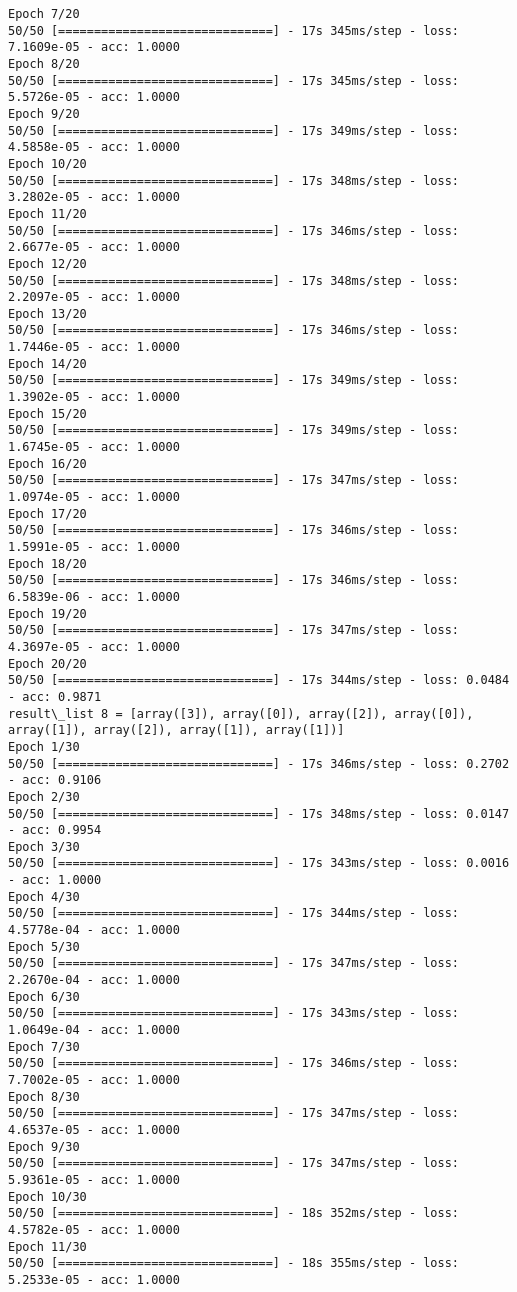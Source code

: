 \documentclass[11pt]{article}
\begin{document}
\begin{Verbatim}[commandchars=\\\{\}]
Epoch 7/20
50/50 [==============================] - 17s 345ms/step - loss: 7.1609e-05 - acc: 1.0000
Epoch 8/20
50/50 [==============================] - 17s 345ms/step - loss: 5.5726e-05 - acc: 1.0000
Epoch 9/20
50/50 [==============================] - 17s 349ms/step - loss: 4.5858e-05 - acc: 1.0000
Epoch 10/20
50/50 [==============================] - 17s 348ms/step - loss: 3.2802e-05 - acc: 1.0000
Epoch 11/20
50/50 [==============================] - 17s 346ms/step - loss: 2.6677e-05 - acc: 1.0000
Epoch 12/20
50/50 [==============================] - 17s 348ms/step - loss: 2.2097e-05 - acc: 1.0000
Epoch 13/20
50/50 [==============================] - 17s 346ms/step - loss: 1.7446e-05 - acc: 1.0000
Epoch 14/20
50/50 [==============================] - 17s 349ms/step - loss: 1.3902e-05 - acc: 1.0000
Epoch 15/20
50/50 [==============================] - 17s 349ms/step - loss: 1.6745e-05 - acc: 1.0000
Epoch 16/20
50/50 [==============================] - 17s 347ms/step - loss: 1.0974e-05 - acc: 1.0000
Epoch 17/20
50/50 [==============================] - 17s 346ms/step - loss: 1.5991e-05 - acc: 1.0000
Epoch 18/20
50/50 [==============================] - 17s 346ms/step - loss: 6.5839e-06 - acc: 1.0000
Epoch 19/20
50/50 [==============================] - 17s 347ms/step - loss: 4.3697e-05 - acc: 1.0000
Epoch 20/20
50/50 [==============================] - 17s 344ms/step - loss: 0.0484 - acc: 0.9871
result\_list 8 = [array([3]), array([0]), array([2]), array([0]), array([1]), array([2]), array([1]), array([1])]
Epoch 1/30
50/50 [==============================] - 17s 346ms/step - loss: 0.2702 - acc: 0.9106
Epoch 2/30
50/50 [==============================] - 17s 348ms/step - loss: 0.0147 - acc: 0.9954
Epoch 3/30
50/50 [==============================] - 17s 343ms/step - loss: 0.0016 - acc: 1.0000
Epoch 4/30
50/50 [==============================] - 17s 344ms/step - loss: 4.5778e-04 - acc: 1.0000
Epoch 5/30
50/50 [==============================] - 17s 347ms/step - loss: 2.2670e-04 - acc: 1.0000
Epoch 6/30
50/50 [==============================] - 17s 343ms/step - loss: 1.0649e-04 - acc: 1.0000
Epoch 7/30
50/50 [==============================] - 17s 346ms/step - loss: 7.7002e-05 - acc: 1.0000
Epoch 8/30
50/50 [==============================] - 17s 347ms/step - loss: 4.6537e-05 - acc: 1.0000
Epoch 9/30
50/50 [==============================] - 17s 347ms/step - loss: 5.9361e-05 - acc: 1.0000
Epoch 10/30
50/50 [==============================] - 18s 352ms/step - loss: 4.5782e-05 - acc: 1.0000
Epoch 11/30
50/50 [==============================] - 18s 355ms/step - loss: 5.2533e-05 - acc: 1.0000

\end{Verbatim}
\end{document}
